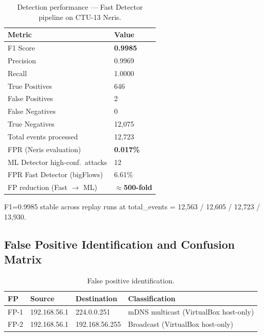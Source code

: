 \documentclass[11pt,a4paper]{article}
\begin{document}
    \begin{table}[h]
        \centering
        \caption{Detection performance --- Fast Detector pipeline on CTU-13 Neris.}
        \label{tab:detection}
        \begin{tabular}{ll}
            \toprule
            \textbf{Metric} & \textbf{Value} \\
            \midrule
            F1 Score                       & \textbf{0.9985} \\
            Precision                      & 0.9969 \\
            Recall                         & 1.0000 \\
            True Positives                 & 646 \\
            False Positives                & 2 \\
            False Negatives                & 0 \\
            True Negatives                 & 12,075 \\
            Total events processed         & 12,723 \\
            FPR (Neris evaluation)         & \textbf{0.017\%} \\
            ML Detector high-conf.\ attacks & 12 \\
            FPR Fast Detector (bigFlows)   & 6.61\% \\
            FP reduction (Fast $\to$ ML)   & \textbf{${\approx}$500-fold} \\
            \bottomrule
        \end{tabular}
    \end{table}

    F1=0.9985 stable across replay runs at total\_events = 12,563 / 12,605 / 12,723 / 13,930.

    \subsection{False Positive Identification and Confusion Matrix}

    \begin{table}[h]
        \centering
        \caption{False positive identification.}
        \label{tab:fps}
        \begin{tabular}{llll}
            \toprule
            \textbf{FP} & \textbf{Source} & \textbf{Destination} & \textbf{Classification} \\
            \midrule
            FP-1 & 192.168.56.1 & 224.0.0.251     & mDNS multicast (VirtualBox host-only) \\
            FP-2 & 192.168.56.1 & 192.168.56.255  & Broadcast (VirtualBox host-only) \\
            \bottomrule
        \end{tabular}
    \end{table}
\end{document}
